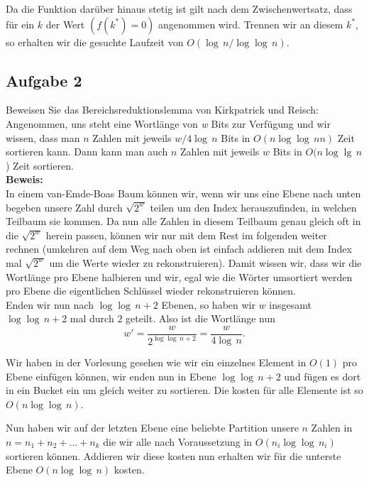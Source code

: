 \documentclass[11pt,a4paper,ngerman]{article}
\begin{document}
Da die Funktion darüber hinaus stetig ist gilt nach dem Zwischenwertsatz, dass für ein $k$ der Wert $(f(k^*) = 0)$ angenommen wird. Trennen wir an diesem $k^*$, so erhalten
wir die gesuchte Laufzeit von $O(\log \, n / \log \log \, n)$.

\subsection*{Aufgabe 2}

Beweisen Sie das Bereichsreduktionslemma von Kirkpatrick und Reisch: Angenommen, uns steht eine Wortlänge von \emph{w} Bits zur Verfügung und wir wissen, dass man $n$ Zahlen mit jeweils $w/4\log \, n$ Bits in $O(n \log\log \,n n)$ Zeit sortieren kann. Dann kann man auch $n$ Zahlen mit jeweils $w$ Bits in $O(n \log \lg \, n$) Zeit sortieren.\\

\noindent\textbf{Beweis:}\\

In einem van-Emde-Boas Baum können wir, wenn wir uns eine Ebene nach unten begeben unsere Zahl durch $\sqrt{2^w}$ teilen um den Index
herauszufinden, in welchen Teilbaum sie kommen. Da nun alle Zahlen in diesem Teilbaum genau gleich oft in die $\sqrt{2^w}$ herein passen, können wir nur mit dem Rest im folgenden weiter rechnen (umkehren auf dem Weg nach oben ist einfach addieren mit dem Index mal $\sqrt{2^w}$ um
die Werte wieder zu rekonstruieren). Damit wissen wir, dass wir die Wortlänge pro Ebene halbieren und wir, egal wie die Wörter umsortiert werden
pro Ebene die eigentlichen Schlüssel wieder rekonstruieren können.\\

Enden wir nun nach $\log \log \, n + 2$ Ebenen, so haben wir  $w$ insgesamt $\log \log \, n + 2$ mal durch $2$ geteilt.
Also ist die Wortlänge nun
$$
	w' = \frac{w}{2^{\log \log \, n + 2}} = \frac{w}{4\log \,n}.
$$

Wir haben in der Vorlesung gesehen wie wir ein einzelnes Element in $O(1)$ pro Ebene einfügen können,  wir enden nun in Ebene $\log \log \, n +2$ und fügen es dort in ein Bucket ein um gleich weiter zu sortieren. Die kosten für alle Elemente ist so $O(n \log \log \, n)$.

Nun haben wir auf der letzten Ebene eine beliebte Partition unsere $n$ Zahlen in $n = n_1 + n_2 + \ldots + n_k$ die wir alle nach Voraussetzung in $O(n_i \log\log \, n_i)$ sortieren können.
Addieren wir diese kosten nun erhalten wir für die unterste Ebene $O(n \log \log \, n)$ kosten.
\end{document}
